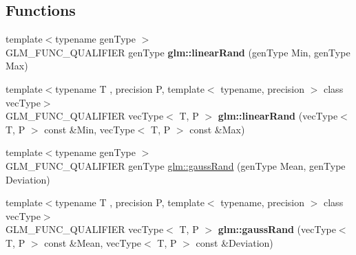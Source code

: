 \subsection*{Functions}
\begin{DoxyCompactItemize}
\item 
\hypertarget{namespaceglm_ad60fbcaa8da896b6f2cdd0aa302b96a4}{{\footnotesize template$<$typename gen\-Type $>$ }\\G\-L\-M\-\_\-\-F\-U\-N\-C\-\_\-\-Q\-U\-A\-L\-I\-F\-I\-E\-R gen\-Type {\bfseries glm\-::linear\-Rand} (gen\-Type Min, gen\-Type Max)}\label{namespaceglm_ad60fbcaa8da896b6f2cdd0aa302b96a4}

\item 
\hypertarget{group__gtc__random_gaba9cec867916d894d794a32897b7fdfd}{{\footnotesize template$<$typename T , precision P, template$<$ typename, precision $>$ class vec\-Type$>$ }\\G\-L\-M\-\_\-\-F\-U\-N\-C\-\_\-\-Q\-U\-A\-L\-I\-F\-I\-E\-R vec\-Type$<$ T, P $>$ {\bfseries glm\-::linear\-Rand} (vec\-Type$<$ T, P $>$ const \&Min, vec\-Type$<$ T, P $>$ const \&Max)}\label{group__gtc__random_gaba9cec867916d894d794a32897b7fdfd}

\item 
{\footnotesize template$<$typename gen\-Type $>$ }\\G\-L\-M\-\_\-\-F\-U\-N\-C\-\_\-\-Q\-U\-A\-L\-I\-F\-I\-E\-R gen\-Type \hyperlink{group__gtc__random_ga5193a83e49e4fdc5652c084711083574}{glm\-::gauss\-Rand} (gen\-Type Mean, gen\-Type Deviation)
\item 
\hypertarget{namespaceglm_adc010d4dd74cff264ee912f72de1adb9}{{\footnotesize template$<$typename T , precision P, template$<$ typename, precision $>$ class vec\-Type$>$ }\\G\-L\-M\-\_\-\-F\-U\-N\-C\-\_\-\-Q\-U\-A\-L\-I\-F\-I\-E\-R vec\-Type$<$ T, P $>$ {\bfseries glm\-::gauss\-Rand} (vec\-Type$<$ T, P $>$ const \&Mean, vec\-Type$<$ T, P $>$ const \&Deviation)}\label{namespaceglm_adc010d4dd74cff264ee912f72de1adb9}


\end{DoxyCompactItemize}
